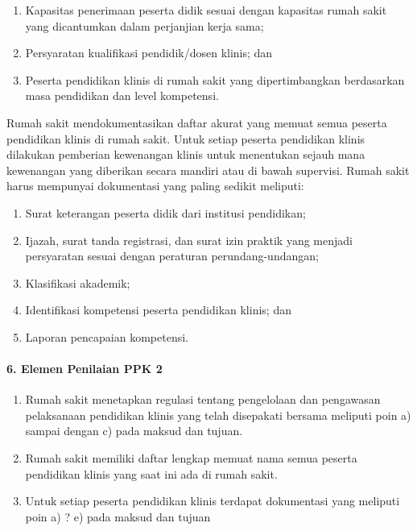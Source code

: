 \documentclass[
]{book}
\providecommand{\tightlist}{%
  \setlength{\itemsep}{0pt}\setlength{\parskip}{0pt}}
\begin{document}
\begin{enumerate}
\def\labelenumi{\alph{enumi}.}
\tightlist
\item
  Kapasitas penerimaan peserta didik sesuai dengan kapasitas rumah sakit yang dicantumkan dalam perjanjian kerja sama;
\item
  Persyaratan kualifikasi pendidik/dosen klinis; dan
\item
  Peserta pendidikan klinis di rumah sakit yang dipertimbangkan berdasarkan masa pendidikan dan level kompetensi.
\end{enumerate}

Rumah sakit mendokumentasikan daftar akurat yang memuat semua peserta pendidikan klinis di rumah sakit. Untuk setiap peserta pendidikan klinis dilakukan pemberian kewenangan klinis untuk menentukan sejauh mana kewenangan yang diberikan secara mandiri atau di bawah supervisi. Rumah sakit harus mempunyai dokumentasi yang paling sedikit meliputi:

\begin{enumerate}
\def\labelenumi{\alph{enumi}.}
\tightlist
\item
  Surat keterangan peserta didik dari institusi pendidikan;
\item
  Ijazah, surat tanda registrasi, dan surat izin praktik yang menjadi persyaratan sesuai dengan peraturan perundang-undangan;
\item
  Klasifikasi akademik;
\item
  Identifikasi kompetensi peserta pendidikan klinis; dan
\item
  Laporan pencapaian kompetensi.
\end{enumerate}

\hypertarget{elemen-penilaian-ppk-2}{%
\paragraph*{6. Elemen Penilaian PPK 2}\label{elemen-penilaian-ppk-2}}

\begin{enumerate}
\def\labelenumi{\alph{enumi}.}
\tightlist
\item
  Rumah sakit menetapkan regulasi tentang pengelolaan dan pengawasan pelaksanaan pendidikan klinis yang telah disepakati bersama meliputi poin a) sampai dengan c) pada maksud dan tujuan.
\item
  Rumah sakit memiliki daftar lengkap memuat nama semua peserta pendidikan klinis yang saat ini ada di rumah sakit.
\item
  Untuk setiap peserta pendidikan klinis terdapat dokumentasi yang meliputi poin a) ? e) pada maksud dan tujuan
\end{enumerate}
\end{document}
